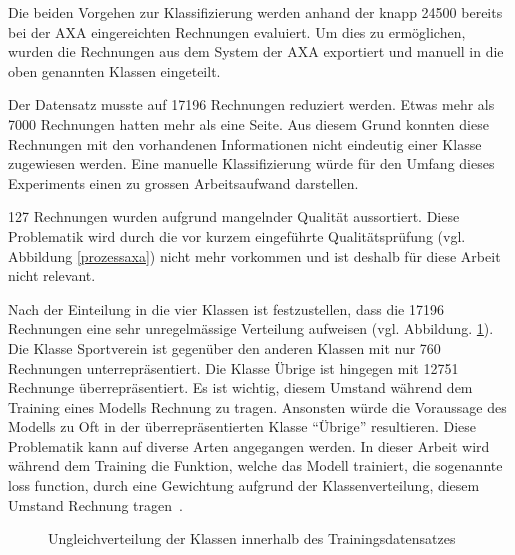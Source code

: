 Die beiden Vorgehen zur Klassifizierung werden anhand der knapp 24500 bereits bei der AXA eingereichten Rechnungen evaluiert. Um dies zu ermöglichen, wurden die Rechnungen aus dem System der AXA exportiert und manuell in die oben genannten Klassen eingeteilt. 

Der Datensatz musste auf 17196 Rechnungen reduziert werden. Etwas mehr als 7000 Rechnungen hatten mehr als eine Seite. Aus diesem Grund konnten diese Rechnungen mit den vorhandenen Informationen nicht eindeutig einer Klasse zugewiesen werden. Eine manuelle Klassifizierung würde für den Umfang dieses Experiments einen zu grossen Arbeitsaufwand darstellen.

127 Rechnungen wurden aufgrund mangelnder Qualität aussortiert. Diese Problematik wird durch die vor kurzem eingeführte Qualitätsprüfung (vgl. Abbildung \ref{prozessaxa}) nicht mehr vorkommen und ist deshalb für diese Arbeit nicht relevant.

Nach der Einteilung in die vier Klassen ist festzustellen, dass die 17196 Rechnungen eine sehr unregelmässige Verteilung aufweisen (vgl. Abbildung. \ref{class-distribution}). Die Klasse Sportverein ist gegenüber den anderen Klassen mit nur 760 Rechnungen unterrepräsentiert. Die Klasse Übrige ist hingegen mit 12751 Rechnunge überrepräsentiert. Es ist wichtig, diesem Umstand während dem Training eines Modells Rechnung zu tragen. Ansonsten würde die Voraussage des Modells zu Oft in der überrepräsentierten Klasse \enquote{Übrige} resultieren. Diese Problematik kann auf diverse Arten angegangen werden. In dieser Arbeit wird während dem Training die Funktion, welche das Modell trainiert, die sogenannte loss function, durch eine Gewichtung aufgrund der Klassenverteilung, diesem Umstand Rechnung tragen~\autocite{Buda2018}.

\begin{figure}[h]
    \captionsetup{width=.8\linewidth}
    \caption{Ungleichverteilung der Klassen innerhalb des Trainingsdatensatzes}
    \label{class-distribution}
    \centering
\end{figure}
